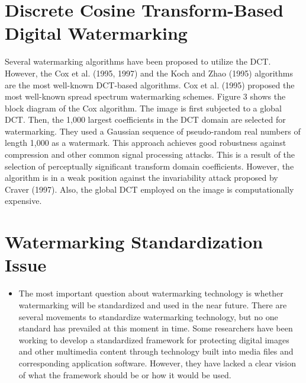 \documentclass[12pt]{IEEEtran}
\begin{document}
\begin{enumerate}
\section{Discrete Cosine Transform-Based Digital Watermarking}
Several watermarking algorithms have been proposed to utilize the DCT. However, the Cox et al. (1995, 1997) and the Koch and Zhao (1995) algorithms are the most well-known DCT-based algorithms. Cox et al. (1995) proposed the most well-known spread spectrum watermarking schemes. Figure 3 shows the block diagram of the Cox algorithm. The image is first subjected to a global DCT. Then, the 1,000 largest coefficients in the DCT domain are selected for watermarking. They used a Gaussian sequence of pseudo-random real numbers of length 1,000 as a watermark. This approach achieves good robustness against compression and other common signal processing attacks. This is a result of the selection of perceptually significant transform domain coefficients. However, the algorithm is in a weak position against the invariability attack proposed by Craver (1997). Also, the global DCT employed on the image is computationally expensive.

\section{Watermarking Standardization Issue}
\begin{itemize}
\item The most important question about watermarking technology is whether watermarking will be standardized and used in the near future. There are several movements to standardize watermarking technology, but no one standard has prevailed at this moment in time. Some researchers have been working to develop a standardized framework for protecting digital images and other multimedia content through technology built into media files and corresponding application software. However, they have lacked a clear vision of what the framework should be or how it would be used.\\


\end{itemize}
\end{enumerate}
\end{document}
